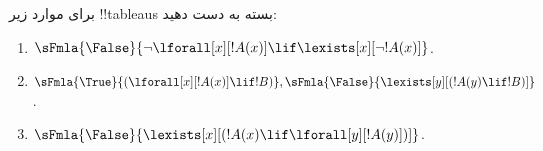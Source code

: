 \documentclass[../../../include/open-logic-section]{subfiles}
\begin{document}
\begin{prob}
برای موارد زیر !!{tableau}s بسته به دست دهید:
\begin{enumerate}
\item $\sFmla{\False}{\lnot\lforall[x][!A(x)] \lif \lexists[x][\lnot!A(x)]}$.
\item $\sFmla{\True}{(\lforall[x][!A(x)] \lif !B)}, \sFmla{\False}{\lexists[y][(!A(y) \lif !B)]}$.
\item $\sFmla{\False}{\lexists[x][(!A(x) \lif \lforall[y][!A(y)])]}$.
\end{enumerate}
\end{prob}
\end{document}
